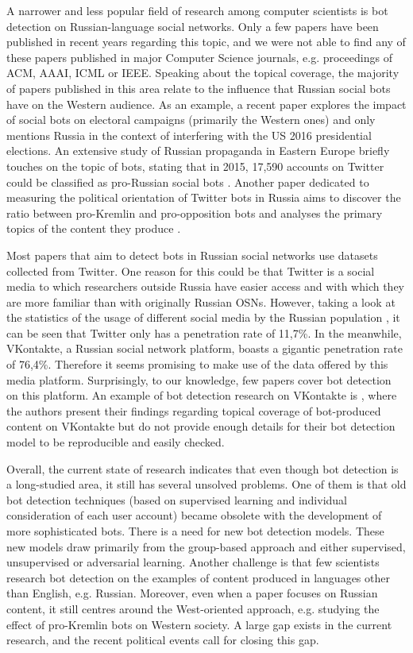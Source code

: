 A narrower and less popular field of research among computer scientists is bot detection on Russian-language social networks. Only a few papers have been published in recent years regarding this topic, and we were not able to find any of these papers published in major Computer Science journals, e.g. proceedings of ACM, AAAI, ICML or IEEE. Speaking about the topical coverage, the majority of papers published in this area relate to the influence that Russian social bots have on the Western audience. As an example, a recent paper \cite{Rheault2021} explores the impact of social bots on electoral campaigns (primarily the Western ones) and only mentions Russia in the context of interfering with the US 2016 presidential elections. An extensive study of Russian propaganda in Eastern Europe briefly touches on the topic of bots, stating that in 2015, 17,590 accounts on Twitter could be classified as pro-Russian social bots \cite{Helmus2018}. Another paper dedicated to measuring the political orientation of Twitter bots in Russia aims to discover the ratio between pro-Kremlin and pro-opposition bots and analyses the primary topics of the content they produce \cite{Stukal2019}.

Most papers that aim to detect bots in Russian social networks use datasets collected from Twitter. One reason for this could be that Twitter is a social media to which researchers outside Russia have easier access and with which they are more familiar than with originally Russian OSNs. However, taking a look at the statistics of the usage of different social media by the Russian population \cite{Statista}, it can be seen that Twitter only has a penetration rate of 11,7\%. In the meanwhile, VKontakte, a Russian social network platform, boasts a gigantic penetration rate of 76,4\%. Therefore it seems promising to make use of the data offered by this media platform. Surprisingly, to our knowledge, few papers cover bot detection on this platform. An example of bot detection research on VKontakte is \cite{Vasilkova2019}, where the authors present their findings regarding topical coverage of bot-produced content on VKontakte but do not provide enough details for their bot detection model to be reproducible and easily checked.

Overall, the current state of research indicates that even though bot detection is a long-studied area, it still has several unsolved problems. One of them is that old bot detection techniques (based on supervised learning and individual consideration of each user account) became obsolete with the development of more sophisticated bots. There is a need for new bot detection models. These new models draw primarily from the group-based approach and either supervised, unsupervised or adversarial learning. Another challenge is that few scientists research bot detection on the examples of content produced in languages other than English, e.g. Russian. Moreover, even when a paper focuses on Russian content, it still centres around the West-oriented approach, e.g. studying the effect of pro-Kremlin bots on Western society. A large gap exists in the current research, and the recent political events call for closing this gap.
